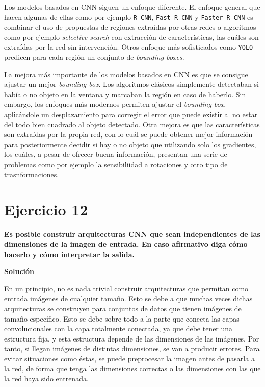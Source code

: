 \documentclass[11pt,a4paper]{article}
\newcommand{\answer}{\noindent\textbf{Solución}}
\newcommand{\question}[1]{\noindent\textbf{#1}}
\newcommand{\nonumsection}[1]{\section*{#1}\addcontentsline{toc}{section}{#1}}
\begin{document}
Los modelos basados en CNN siguen un enfoque diferente. El enfoque
general que hacen algunas de ellas como por ejemplo \texttt{R-CNN},
\texttt{Fast R-CNN} y \texttt{Faster R-CNN} es combinar el uso de propuestas
de regiones extraídas por otras redes o algoritmos como por ejemplo
\textit{selective search} con extracción de características, las cuáles
son extraídas por la red sin intervención. Otros enfoque más sofisticados como
\texttt{YOLO} predicen para cada región un conjunto de \textit{bounding boxes}.

La mejora más importante de los modelos basados en CNN
es que se consigue ajustar un mejor \textit{bounding box}.
Los algoritmos clásicos simplemente detectaban si había o no objeto en la
ventana y marcaban la región en caso de haberlo. Sin embargo, los enfoques
más modernos permiten ajustar el \textit{bounding box}, aplicándole un desplazamiento
para corregir el error que puede existir al no estar del todo bien
cuadrado al objeto detectado.
Otra mejora es que las características son extraídas por la propia red,
con lo cuál se puede obtener mejor información para posteriormente
decidir si hay o no objeto que utilizando solo los gradientes, los cuáles,
a pesar de ofrecer buena información, presentan una serie de problemas como
por ejemplo la sensibiliidad a rotaciones y otro tipo de trasnformaciones.


\nonumsection{Ejercicio 12}

\question{Es posible construir arquitecturas CNN que sean independientes
de las dimensiones de la imagen de entrada. En caso afirmativo diga
cómo hacerlo y cómo interpretar la salida.}

\answer

En un principio, no es nada trivial construir arquitecturas que permitan como
entrada imágenes de cualquier tamaño. Esto se debe a que muchas veces dichas
arquitecturas se construyen para conjuntos de datos que tienen imágenes de tamaño
específico. Esto se debe sobre todo a la parte que conecta las capas convolucionales
con la capa totalmente conectada, ya que debe tener una estructura fija, y esta estructura
depende de las dimensiones de las imágenes. Por tanto, si llegan imágenes
de distintas dimensiones, se van a producir errores. Para evitar situaciones
como éstas, se puede preprocesar la imagen antes de pasarla a la red, de forma
que tenga las dimensiones correctas o las dimensiones con las que la
red haya sido entrenada.
\end{document}
